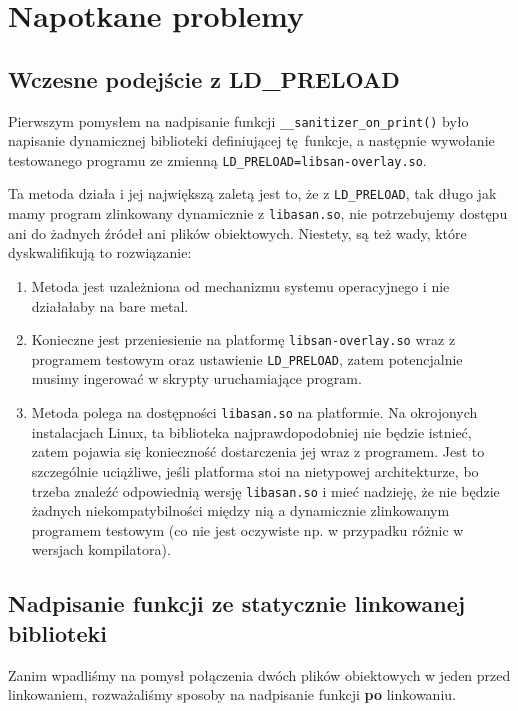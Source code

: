 \documentclass[../main.tex]{subfiles}
\begin{document}
\section{Napotkane problemy}
\subsection{Wczesne podejście z LD\_PRELOAD}
Pierwszym pomysłem na nadpisanie funkcji \texttt{__sanitizer_on_print()}
było napisanie dynamicznej biblioteki definiującej tę funkcje, a następnie
wywołanie testowanego programu ze zmienną
\texttt{LD_PRELOAD=libsan-overlay.so}.

Ta metoda działa i jej największą zaletą jest to, że z
\texttt{LD_PRELOAD}, tak długo jak mamy program zlinkowany dynamicznie
z \texttt{libasan.so}, nie potrzebujemy dostępu ani do żadnych źródeł
ani plików obiektowych. Niestety, są też wady, które dyskwalifikują to
rozwiązanie:

\begin{enumerate}
	\item Metoda jest uzależniona od mechanizmu systemu operacyjnego i nie
		działałaby na bare metal.
	\item Konieczne jest przeniesienie na platformę
		\texttt{libsan-overlay.so} wraz z programem testowym oraz
		ustawienie \texttt{LD_PRELOAD}, zatem potencjalnie musimy
		ingerować w skrypty uruchamiające program.
	\item Metoda polega na dostępności \texttt{libasan.so} na
		platformie. Na okrojonych instalacjach Linux, ta biblioteka
		najprawdopodobniej nie będzie istnieć, zatem pojawia się konieczność
		dostarczenia jej wraz z programem. Jest to szczególnie uciążliwe, jeśli
		platforma stoi na nietypowej architekturze, bo trzeba znaleźć
		odpowiednią wersję \texttt{libasan.so} i mieć nadzieję, że nie
		będzie żadnych niekompatybilności między nią a dynamicznie zlinkowanym
		programem testowym (co nie jest oczywiste np. w przypadku różnic w
		wersjach kompilatora).
\end{enumerate}

\subsection{Nadpisanie funkcji ze statycznie linkowanej biblioteki}
Zanim wpadliśmy na pomysł połączenia dwóch plików obiektowych w jeden przed
linkowaniem, rozważaliśmy sposoby na nadpisanie funkcji \textbf{po} linkowaniu.
\end{document}

